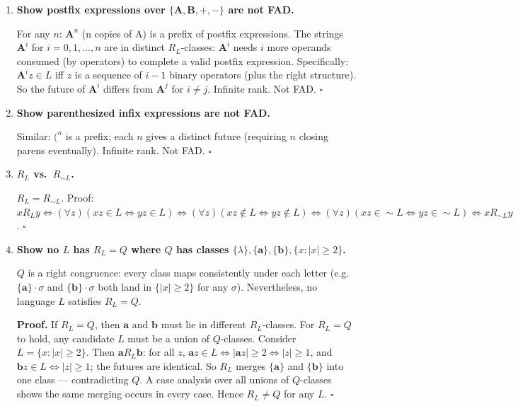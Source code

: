 \begin{enumerate}[{2.}1.]
\item \textbf{Show postfix expressions over $\{\mathbf{A},\mathbf{B},\mathbf{+},\mathbf{-}\}$ are not FAD.}

For any $n$: $\mathbf{A}^n$ (n copies of A) is a prefix of postfix expressions. The strings $\mathbf{A}^i$ for $i=0,1,\ldots,n$ are in distinct $R_L$-classes: $\mathbf{A}^i$ needs $i$ more operands consumed (by operators) to complete a valid postfix expression. Specifically: $\mathbf{A}^i z\in L$ iff $z$ is a sequence of $i-1$ binary operators (plus the right structure). So the future of $\mathbf{A}^i$ differs from $\mathbf{A}^j$ for $i\neq j$. Infinite rank. Not FAD. $\square$

\item \textbf{Show parenthesized infix expressions are not FAD.}

Similar: $\mathbf{(}^n$ is a prefix; each $n$ gives a distinct future (requiring $n$ closing parens eventually). Infinite rank. Not FAD. $\square$

\item \textbf{$R_L$ vs.\ $R_{\sim L}$.}

$R_L = R_{\sim L}$. Proof: $x R_L y\Leftrightarrow(\forall z)(xz\in L\Leftrightarrow yz\in L)\Leftrightarrow(\forall z)(xz\notin L\Leftrightarrow yz\notin L)\Leftrightarrow(\forall z)(xz\in\sim L\Leftrightarrow yz\in\sim L)\Leftrightarrow x R_{\sim L} y$. $\square$

\item \textbf{Show no $L$ has $R_L=Q$ where $Q$ has classes $\{\lambda\},\{\mathbf{a}\},\{\mathbf{b}\},\{x:|x|\geq 2\}$.}

$Q$ is a right congruence: every class maps consistently under each letter (e.g.\ $\{\mathbf{a}\}\cdot\sigma$ and $\{\mathbf{b}\}\cdot\sigma$ both land in $\{|x|\geq 2\}$ for any $\sigma$). Nevertheless, no language $L$ satisfies $R_L=Q$.

\textbf{Proof.} If $R_L=Q$, then $\mathbf{a}$ and $\mathbf{b}$ must lie in different $R_L$-classes. For $R_L=Q$ to hold, any candidate $L$ must be a union of $Q$-classes. Consider $L=\{x:|x|\geq 2\}$. Then $\mathbf{a} R_L \mathbf{b}$: for all $z$, $\mathbf{a}z\in L\Leftrightarrow|\mathbf{a}z|\geq 2\Leftrightarrow|z|\geq 1$, and $\mathbf{b}z\in L\Leftrightarrow|z|\geq 1$; the futures are identical. So $R_L$ merges $\{\mathbf{a}\}$ and $\{\mathbf{b}\}$ into one class — contradicting $Q$. A case analysis over all unions of $Q$-classes shows the same merging occurs in every case. Hence $R_L\neq Q$ for any $L$. $\square$


\end{enumerate}
